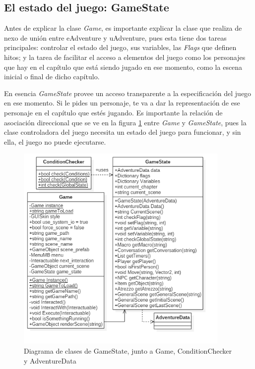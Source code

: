 \newpage

\subsection{El estado del juego: GameState}

Antes de explicar la clase \textit{Game}, es importante explicar la clase que realiza de nexo de unión entre eAdventure y uAdventure, pues esta tiene dos tareas principales: controlar el estado del juego, sus variables, las \textit{Flags} que definen hitos; y la tarea de facilitar el acceso a elementos del juego como los personajes que hay en el capítulo que está siendo jugado en ese momento, como la escena inicial o final de dicho capítulo.

En esencia \textit{GameState} provee un acceso transparente a la especificación del juego en ese momento. Si le pides un personaje, te va a dar la representación de ese personaje en el capítulo que estés jugando. Es importante la relación de asociación direccional que se ve en la figura \ref{gamestateit2} entre \textit{Game} y \textit{GameState}, pues la clase controladora del juego necesita un estado del juego para funcionar, y sin ella, el juego no puede ejecutarse.

\begin{figure}[h!]
	\centerline{\includegraphics[height=4in]{figures/it2/GameState.png}}
	\caption[GameState - Versión Final]{Diagrama de clases de GameState, junto a Game, ConditionChecker y AdventureData}
	\label{gamestateit2}
\end{figure}

